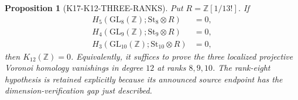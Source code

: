 \documentclass[11pt,a4paper]{article}
\newtheorem{proposition}[theorem]{Proposition}
\theoremstyle{definition}
\begin{document}
\begin{proposition}[K17-K12-THREE-RANKS]
\label{prop:k12-three-ranks}
Put $R=\mathbb Z[1/13!]$.  If
\[
\begin{split}
 H_5(\mathrm{GL}_8(\mathbb Z);\mathrm{St}_8\otimes R)&=0,\\
 H_4(\mathrm{GL}_9(\mathbb Z);\mathrm{St}_9\otimes R)&=0,\\
 H_3(\mathrm{GL}_{10}(\mathbb Z);\mathrm{St}_{10}\otimes R)&=0,
\end{split}                                                     \tag{KI.2}
\]
then $K_{12}(\mathbb Z)=0$.
Equivalently, it suffices to prove the three localized projective
Voronoi homology vanishings in degree $12$ at ranks $8,9,10$.
The rank-eight hypothesis is retained explicitly because its announced
source endpoint has the dimension-verification gap just described.
\end{proposition}
\end{document}
